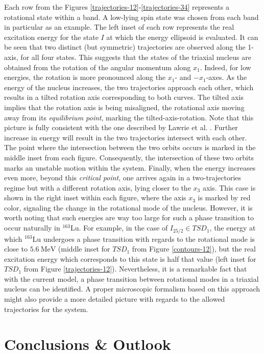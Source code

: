 \documentclass[myclassdoc,debug]{rjparticle}
\begin{document}
Each row from the Figures \ref{trajectories-12}-\ref{trajectories-34} represents a rotational state within a band. A low-lying spin state was chosen from each band in particular as an example. The left inset of each row represents the real excitation energy for the state $I$ at which the energy ellipsoid is evaluated. It can be seen that two distinct (but symmetric) trajectories are observed along the 1-axis, for all four states. This suggests that the states of the triaxial nucleus are obtained from the rotation of the angular momentum along $x_1$. Indeed, for low energies, the rotation is more pronounced along the $x_1$- and $-x_1$-axes. As the energy of the nucleus increases, the two trajectories approach each other, which results in a tilted rotation axis corresponding to both curves. The tilted axis implies that the rotation axis is being misaligned, the rotational axis moving away from its \emph{equilibrium point}, marking the tilted-axis-rotation. Note that this picture is fully consistent with the one described by Lawrie et al. \cite{lawrie2020tilted}. Further increase in energy will result in the two trajectories intersect with each other. The point where the intersection between the two orbits occurs is marked in the middle inset from each figure. Consequently, the intersection of these two orbits marks an unstable motion within the system. Finally, when the energy increases even more, beyond this \emph{critical point}, one arrives again in a two-trajectories regime but with a different rotation axis, lying closer to the $x_3$ axis. This case is shown in the right inset within each figure, where the axis $x_3$ is marked by red color, signaling the change in the rotational mode of the nucleus. However, it is worth noting that such energies are way too large for such a phase transition to occur naturally in $^{163}$Lu. For example, in the case of $I_{25/2}\in TSD_1$, the energy at which $^{163}$Lu undergoes a phase transition with regards to the rotational mode is close to $5.6\ \text{MeV}$ (middle inset for $TSD_1$ from Figure \ref{contours-12}), but the real excitation energy which corresponds to this state is half that value (left inset for $TSD_1$ from Figure \ref{trajectories-12}). Nevertheless, it is a remarkable fact that with the current model, a phase transition between rotational modes in a triaxial nucleus can be identified. A proper microscopic formalism based on this approach might also provide a more detailed picture with regards to the allowed trajectories for the system.

\section{Conclusions \& Outlook}
\label{section-gata}
\end{document}
